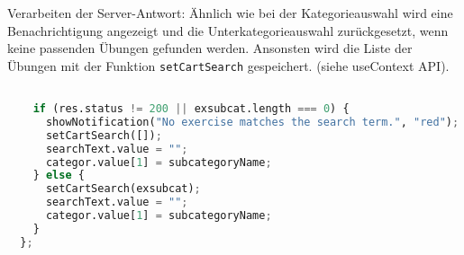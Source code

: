 Verarbeiten der Server-Antwort: Ähnlich wie bei der Kategorieauswahl wird eine Benachrichtigung angezeigt und die Unterkategorieauswahl zurückgesetzt, wenn keine passenden Übungen gefunden werden. Ansonsten wird die Liste der Übungen mit der Funktion \texttt{setCartSearch} gespeichert. (siehe useContext API).


\begin{lstlisting}[language=Python]

    if (res.status != 200 || exsubcat.length === 0) {
      showNotification("No exercise matches the search term.", "red");
      setCartSearch([]);
      searchText.value = "";
      categor.value[1] = subcategoryName;
    } else {
      setCartSearch(exsubcat);
      searchText.value = "";
      categor.value[1] = subcategoryName;
    }
  };
\end{lstlisting}